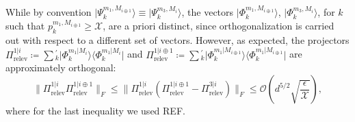 While by convention $\vert \Psi_k^{m_1,M_{i\oplus 1}}\rangle \equiv \vert \Psi_k^{m_3,M_i}\rangle$, the vectors $\vert \Phi_k^{m_1,M_{i\oplus 1}}\rangle$, $\vert \Phi_k^{m_3,M_i}\rangle$, for $k$ such that $p_k^{m_1,M_{i\oplus 1}}\geq \mathcal{X}$, are a priori distinct, since orthogonalization is carried out with respect to a different set of vectors. However, as expected, the projectors $\Pi_{\text{relev}}^{1\vert i}\coloneqq \sum{}^{'}_k \vert \Phi_k^{m_1\vert M_i}\rangle \langle \Phi_k^{m_1\vert M_i} \vert $ and $\Pi_{\text{relev}}^{1\vert i\oplus 1}\coloneqq \sum{}^{'}_k \vert \Phi_k^{m_1\vert M_{i\oplus 1}}\rangle \langle \Phi_k^{m_1\vert M_{i\oplus 1}} \vert$ are approximately orthogonal:
\begin{equation}
\|\Pi_{\text{relev}}^{1\vert i} \Pi_{\text{relev}}^{1\vert i\oplus 1}\|_F \leq \|\Pi_{\text{relev}}^{1\vert i}(\Pi_{\text{relev}}^{1\vert i\oplus 1}-\Pi_{\text{relev}}^{3\vert i})\|_F\leq \mathcal{O}(d^{5/2}\sqrt{\frac{\epsilon}{\mathcal{X}}}),
\end{equation}
where for the last inequality we used REF.
